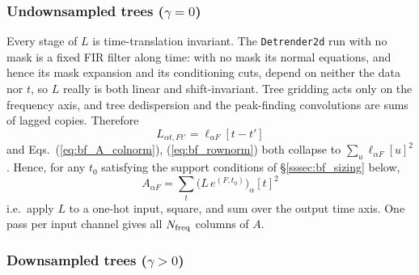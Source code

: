 \documentclass{article}
\numberwithin{equation}{section}   %
\begin{document}
\subsubsection{Undownsampled trees ($\gamma=0$)}

Every stage of $L$ is time-translation invariant. The {\tt Detrender2d} run with no mask is a fixed
FIR filter along time: with no mask its normal equations, and hence its mask expansion and its
conditioning cuts, depend on neither the data nor $t$, so $L$ really is both linear and
shift-invariant. Tree gridding acts only on the frequency axis, and tree dedispersion and the
peak-finding convolutions are sums of lagged copies. Therefore
\begin{equation}
L_{\alpha t, F t'} = \ell_{\alpha F}[t-t']
\end{equation}
and Eqs.\ (\ref{eq:bf_A_colnorm}), (\ref{eq:bf_rownorm}) both collapse to
$\sum_u \ell_{\alpha F}[u]^2$. Hence, for any $t_0$ satisfying the support conditions of
\S\ref{sssec:bf_sizing} below,
\begin{equation}
A_{\alpha F} = \sum_t \big( L \, e^{(F,t_0)} \big)_\alpha[t]^2
\label{eq:bf_master}
\end{equation}
i.e.\ apply $L$ to a one-hot input, square, and sum over the output time axis. One pass per input
channel gives all $N_{\rm freq}$ columns of $A$.

\subsubsection{Downsampled trees ($\gamma>0$)}
\end{document}
